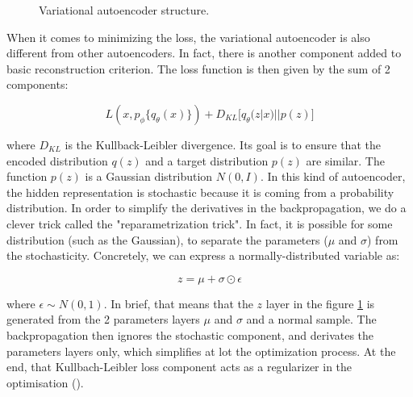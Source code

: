 \documentclass{article}
\def\layersep{2cm}
\begin{document}
\begin{figure}[h]
	\caption{Variational autoencoder structure.}
	\label{fig:VAEstructure}
\end{figure}

When it comes to minimizing the loss, the variational autoencoder is also different from other autoencoders. In fact, there is another component added to basic reconstruction criterion. The loss function is then given by the sum of 2 components:

$$
L(x, p_\phi\{q_\theta(x)\}) + D_{KL}\big[q_\theta(z|x) || p(z)\big]
$$

where $D_{KL}$ is the Kullback-Leibler divergence. Its goal is to ensure that the encoded distribution $q(z)$ and a target distribution $p(z)$ are similar. The function $p(z)$ is a Gaussian distribution $N(0, I)$. In this kind of autoencoder, the hidden representation is stochastic because it is coming from a probability distribution. In order to simplify the derivatives in the backpropagation, we do a clever trick called the "reparametrization trick". In fact, it is possible for some distribution (such as the Gaussian), to separate the parameters ($\mu$ and $\sigma$) from the stochasticity. Concretely, we can express a normally-distributed variable as:

$$
z = \mu + \sigma \odot \epsilon
$$

\noindent where $\epsilon \sim N(0,1)$. In brief, that means that the $z$ layer in the figure \ref{fig:VAEstructure} is generated from the 2 parameters layers $\mu$ and $\sigma$ and a normal sample. The backpropagation then ignores the stochastic component, and derivates the parameters layers only, which simplifies at lot the optimization process. At the end, that Kullbach-Leibler loss component acts as a regularizer in the optimisation (\cite{kingma2013autoencoding}).
\end{document}
